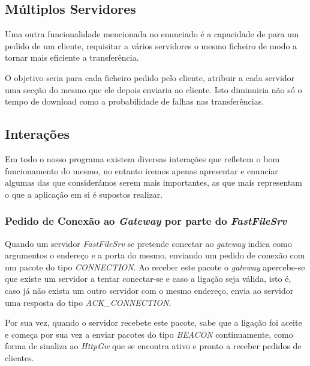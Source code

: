 \documentclass[11pt]{article}
\begin{document}
\subsection{Múltiplos Servidores}

\par Uma outra funcionalidade mencionada no enunciado é a capacidade de para um pedido de um cliente, requisitar a vários servidores o mesmo ficheiro de modo a tornar mais eficiente a transferência.\\ 

\par O objetivo seria para cada ficheiro pedido pelo cliente, atribuir a cada servidor uma secção do mesmo que ele depois enviaria ao cliente. Isto diminuiria não só o tempo de download como a probabilidade de falhas nas transferências.


\subsection{Interações}

\par Em todo o nosso programa existem diversas interações que refletem o bom funcionamento do mesmo, no entanto iremos apenas apresentar e enunciar algumas das que considerámos serem mais importantes, as que mais representam o que a aplicação em si é supostos realizar.

\subsubsection{Pedido de Conexão ao \textit{Gateway} por parte do \textit{FastFileSrv}}

\par Quando um servidor \textit{FastFileSrv} se pretende conectar ao \textit{gateway} indica como argumentos o endereço e a porta do mesmo, enviando um pedido de conexão com um pacote do tipo \textit{CONNECTION}. Ao receber este pacote o \textit{gateway} apercebe-se que existe um servidor a tentar conectar-se e caso a ligação seja válida, isto é, caso já não exista um outro servidor com o mesmo endereço, envia ao servidor uma resposta do tipo \textit{ACK\_CONNECTION}.\\

\par Por sua vez, quando o servidor recebete este pacote, sabe que a ligação foi aceite e começa por sua vez a enviar pacotes do tipo \textit{BEACON} continuamente, como forma de sinaliza ao \textit{HttpGw} que se encontra ativo e pronto a receber pedidos de clientes.\\
\end{document}
